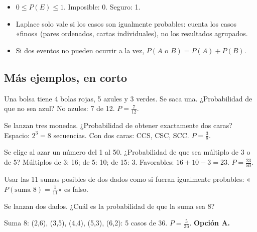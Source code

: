 \begin{regla}
\begin{itemize}
  \item $0 \le P(E) \le 1$. Imposible: 0. Seguro: 1.
  \item Laplace solo vale si los casos son igualmente probables: cuenta los casos «finos» (pares ordenados, cartas
  individuales), no los resultados agrupados.
  \item Si dos eventos no pueden ocurrir a la vez, $P(A \text{ o } B) = P(A) + P(B)$.
\end{itemize}
\end{regla}

\subsection{Más ejemplos, en corto}
\begin{ejemplo}
Una bolsa tiene 4 bolas rojas, 5 azules y 3 verdes. Se saca una. ¿Probabilidad de que no sea azul?
\solucion No azules: 7 de 12. $P = \tfrac{7}{12}$.
\end{ejemplo}

\begin{ejemplo}
Se lanzan tres monedas. ¿Probabilidad de obtener exactamente dos caras?
\solucion Espacio: $2^3 = 8$ secuencias. Con dos caras: CCS, CSC, SCC. $P = \tfrac38$.
\end{ejemplo}

\begin{ejemplo}
Se elige al azar un número del 1 al 50. ¿Probabilidad de que sea múltiplo de 3 o de 5?
\solucion Múltiplos de 3: 16; de 5: 10; de 15: 3. Favorables: $16 + 10 - 3 = 23$. $P = \tfrac{23}{50}$.
\end{ejemplo}

\begin{trampa}
Usar las 11 sumas posibles de dos dados como si fueran igualmente probables: «$P(\text{suma } 8) = \tfrac{1}{11}$» es
falso.
\end{trampa}

\begin{reto}
Se lanzan dos dados. ¿Cuál es la probabilidad de que la suma sea 8?
\end{reto}

\begin{retoresuelto}
Suma 8: (2,6), (3,5), (4,4), (5,3), (6,2): 5 casos de 36. $P = \tfrac{5}{36}$. \textbf{Opción A.}
\end{retoresuelto}

